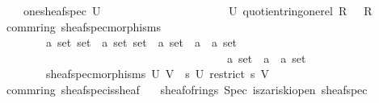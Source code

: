 \documentclass[12pt]{scrartcl}
\begin{document}
\begin{isabelle}
\ \ \ \ \ {\isachardoublequoteopen}one{\isacharunderscore}{\kern0pt}sheaf{\isacharunderscore}{\kern0pt}spec\ U\ {\isasymequiv}\ \isanewline
\ \ \ \ \ \ \ \ \ \ \ \ \ \ \ \ \ \ \ \ {\isasymlambda}{\isasympp}{\isasymin}U{\isachardot}{\kern0pt}\ quotient{\isacharunderscore}{\kern0pt}ring{\isachardot}{\kern0pt}one{\isacharunderscore}{\kern0pt}rel\ {\isacharparenleft}{\kern0pt}R\ {\isasymsetminus}\ {\isasympp}{\isacharparenright}{\kern0pt}\ R\ {\isacharparenleft}{\kern0pt}{\isacharplus}{\kern0pt}{\isacharparenright}{\kern0pt}\ {\isacharparenleft}{\kern0pt}{\isasymcdot}{\isacharparenright}{\kern0pt}\ {\isasymzero}\ {\isasymone}{\isachardoublequoteclose}\isanewline
\isanewline
{}\isamarkupfalse%
\ {\isacharparenleft}{\kern0pt}\ comm{\isacharunderscore}{\kern0pt}ring{\isacharparenright}{\kern0pt}\ sheaf{\isacharunderscore}{\kern0pt}spec{\isacharunderscore}{\kern0pt}morphisms\isanewline
\ \ \ \ \ \ \ \ {\isacharcolon}{\kern0pt}{\isacharcolon}{\kern0pt}\ {\isachardoublequoteopen}{\isacharprime}{\kern0pt}a\ set\ set\ {\isasymRightarrow}\ {\isacharprime}{\kern0pt}a\ set\ set\ {\isasymRightarrow}\ {\isacharparenleft}{\kern0pt}{\isacharparenleft}{\kern0pt}{\isacharprime}{\kern0pt}a\ set\ {\isasymRightarrow}\ {\isacharparenleft}{\kern0pt}{\isacharprime}{\kern0pt}a\ {\isasymtimes}\ {\isacharprime}{\kern0pt}a{\isacharparenright}{\kern0pt}\ set{\isacharparenright}{\kern0pt}\ \isanewline
\ \ \ \ \ \ \ \ \ \ \ \ \ \ \ \ \ \ \ \ \ \ \ \ \ \ \ \ \ \ \ \ \ \ \ \ \ \ \ \ {\isasymRightarrow}\ {\isacharparenleft}{\kern0pt}{\isacharprime}{\kern0pt}a\ set\ {\isasymRightarrow}\ {\isacharparenleft}{\kern0pt}{\isacharprime}{\kern0pt}a\ {\isasymtimes}\ {\isacharprime}{\kern0pt}a{\isacharparenright}{\kern0pt}\ set{\isacharparenright}{\kern0pt}{\isacharparenright}{\kern0pt}{\isachardoublequoteclose}\isanewline
\ \ \ \ \ \ \ \ \ {\isachardoublequoteopen}sheaf{\isacharunderscore}{\kern0pt}spec{\isacharunderscore}{\kern0pt}morphisms\ U\ V\ {\isasymequiv}\ {\isasymlambda}s{\isasymin}{\isacharparenleft}{\kern0pt}{\isasymO}\ U{\isacharparenright}{\kern0pt}{\isachardot}{\kern0pt}\ restrict\ s\ V{\isachardoublequoteclose}\isanewline
\isanewline
{}\isamarkupfalse%
\ {\isacharparenleft}{\kern0pt}\ comm{\isacharunderscore}{\kern0pt}ring{\isacharparenright}{\kern0pt}\ sheaf{\isacharunderscore}{\kern0pt}spec{\isacharunderscore}{\kern0pt}is{\isacharunderscore}{\kern0pt}sheaf{\isacharcolon}{\kern0pt}\isanewline
\ \ \ {\isachardoublequoteopen}sheaf{\isacharunderscore}{\kern0pt}of{\isacharunderscore}{\kern0pt}rings\ Spec\ is{\isacharunderscore}{\kern0pt}zariski{\isacharunderscore}{\kern0pt}open\ sheaf{\isacharunderscore}{\kern0pt}spec\ \isanewline

\end{isabelle}
\end{document}
